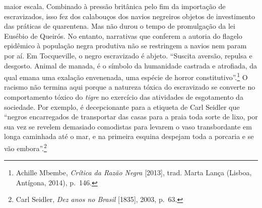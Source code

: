 maior escala. Combinado à pressão britânica pelo fim da importação de
escravizados, isso fez dos calabouços dos navios negreiros objetos de
investimento das práticas de quarentena. Mas não durou o tempo de
promulgação da lei Eusébio de Queirós. No entanto, narrativas que
conferem a autoria do flagelo epidêmico à população negra produtiva não
se restringem a navios nem param por aí. Em Tocqueville, o negro
escravizado é abjeto. ``Suscita aversão, repulsa e desgosto. Animal de
manada, é o símbolo da humanidade castrada e atrofiada, da qual emana
uma exalação envenenada, uma espécie de horror constitutivo''.\footnote{Achille
  Mbembe, \textit{Crítica da Razão Negra} {[}2013{]}, trad. Marta Lança
  (Lisboa, Antígona, 2014), p.~146.} O racismo não termina aqui porque a
natureza tóxica do escravizado se converte no comportamento tóxico do
\textit{tigre} no exercício das atividades de esgotamento da sociedade.
Por exemplo, é decepcionante para a etiqueta de Carl Seidler que
``negros encarregados de transportar das casas para a praia toda sorte
de lixo, por sua vez se revelem demasiado comodistas para levarem o vaso
transbordante em longa caminhada até o mar, e na primeira esquina
despejam toda a porcaria e se vão embora''.\footnote{Carl Seidler,
  \textit{Dez anos no Brasil} {[}1835{]}, 2003, p.~63.}

